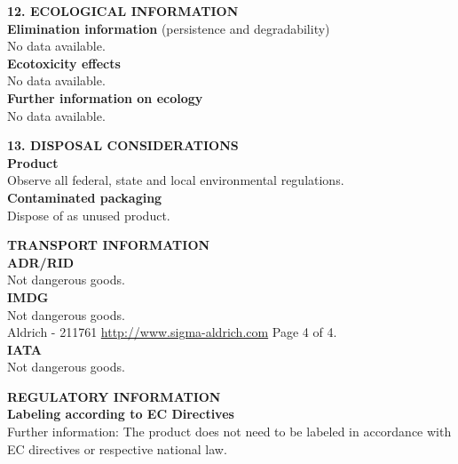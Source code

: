 \begin{multicols*}{2}
\begin{flushleft}
\begin{sans}
\textbf{12. ECOLOGICAL INFORMATION}\\
\textbf{Elimination information} (persistence and degradability)\\
No data available.\\
\textbf{Ecotoxicity effects}\\
No data available.\\
\textbf{Further information on ecology}\\
No data available.

\textbf{13. DISPOSAL CONSIDERATIONS}\\
\textbf{Product}\\
Observe all federal, state and local environmental regulations.\\
\textbf{Contaminated packaging}\\
Dispose of as unused product.

\textbf{TRANSPORT INFORMATION}\\
\textbf{ADR/RID}\\
Not dangerous goods.\\
\textbf{IMDG}\\
Not dangerous goods.\\
Aldrich - 211761 \url{http://www.sigma-aldrich.com} Page 4 of 4.\\
\textbf{IATA}\\
Not dangerous goods.

\textbf{REGULATORY INFORMATION}\\
\textbf{Labeling according to EC Directives}\\
Further information: The product does not need to be labeled in accordance with EC directives or respective national law.

\end{sans}
\end{flushleft}
\end{multicols*}